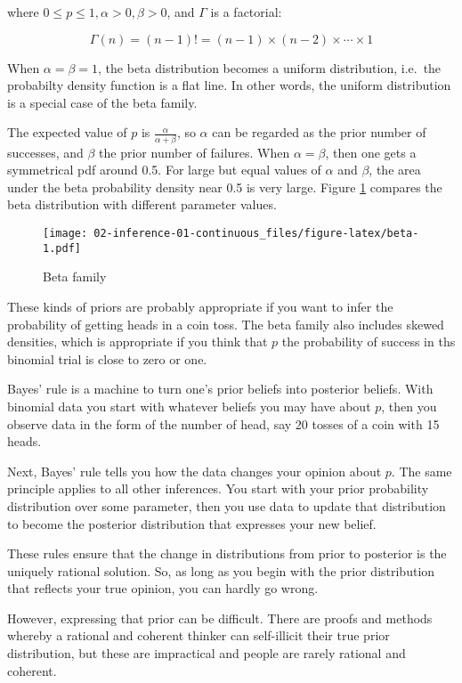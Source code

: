 \documentclass[]{book}
\theoremstyle{definition}
\theoremstyle{definition}
\theoremstyle{remark}
\begin{document}
where \(0 \leq p \leq 1, \alpha>0, \beta>0\), and \(\Gamma\) is a
factorial:

\[\Gamma(n) = (n-1)! = (n-1) \times (n-2) \times \cdots \times 1\]

When \(\alpha=\beta=1\), the beta distribution becomes a uniform
distribution, i.e.~the probabilty density function is a flat line. In
other words, the uniform distribution is a special case of the beta
family.

The expected value of \(p\) is \(\frac{\alpha}{\alpha+\beta}\), so
\(\alpha\) can be regarded as the prior number of successes, and
\(\beta\) the prior number of failures. When \(\alpha=\beta\), then one
gets a symmetrical pdf around 0.5. For large but equal values of
\(\alpha\) and \(\beta\), the area under the beta probability density
near 0.5 is very large. Figure \ref{fig:beta} compares the beta
distribution with different parameter values.

\begin{figure}
\centering
\texttt{[image: 02-inference-01-continuous\_files/figure-latex/beta-1.pdf]}
\caption{\label{fig:beta}Beta family}
\end{figure}

These kinds of priors are probably appropriate if you want to infer the
probability of getting heads in a coin toss. The beta family also
includes skewed densities, which is appropriate if you think that \(p\)
the probability of success in ths binomial trial is close to zero or
one.

Bayes' rule is a machine to turn one's prior beliefs into posterior
beliefs. With binomial data you start with whatever beliefs you may have
about \(p\), then you observe data in the form of the number of head,
say 20 tosses of a coin with 15 heads.

Next, Bayes' rule tells you how the data changes your opinion about
\(p\). The same principle applies to all other inferences. You start
with your prior probability distribution over some parameter, then you
use data to update that distribution to become the posterior
distribution that expresses your new belief.

These rules ensure that the change in distributions from prior to
posterior is the uniquely rational solution. So, as long as you begin
with the prior distribution that reflects your true opinion, you can
hardly go wrong.

However, expressing that prior can be difficult. There are proofs and
methods whereby a rational and coherent thinker can self-illicit their
true prior distribution, but these are impractical and people are rarely
rational and coherent.
\end{document}
